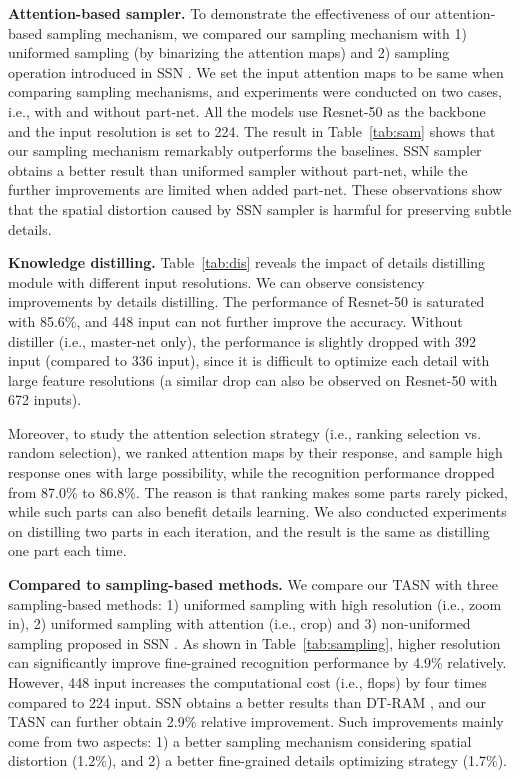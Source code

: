 \documentclass[10pt,twocolumn,letterpaper]{article}
\begin{document}
\textbf{Attention-based sampler.}
To demonstrate the effectiveness of our attention-based sampling mechanism, we compared our sampling mechanism with 1) uniformed sampling (by binarizing the attention maps) and 2) sampling operation introduced in SSN \cite{recasens2018learning}. We set the input attention maps to be same when comparing sampling mechanisms, and experiments were conducted on two cases, i.e., with and without part-net. All the models use Resnet-50 as the backbone and the input resolution is set to 224. The result in Table~\ref{tab:sam} shows that our sampling mechanism remarkably outperforms the baselines. SSN sampler obtains a better result than uniformed sampler without part-net, while the further improvements are limited when added part-net. These observations show that the spatial distortion caused by SSN sampler is harmful for preserving subtle details.

\textbf{Knowledge distilling.}
Table~\ref{tab:dis} reveals the impact of details distilling module with different input resolutions. We can observe consistency improvements by details distilling. The performance of Resnet-50 \cite{ResNet} is saturated with 85.6\%, and 448 input can not further improve the accuracy. Without distiller (i.e., master-net only), the performance is slightly dropped with 392 input (compared to 336 input), since it is difficult to optimize each detail with large feature resolutions (a similar drop can also be observed on Resnet-50 with 672 inputs).

Moreover, to study the attention selection strategy (i.e., ranking selection vs. random selection), we ranked attention maps by their response, and sample high response ones with large possibility, while the recognition performance dropped from 87.0\% to 86.8\%. The reason is that ranking makes some parts rarely picked, while such parts can also benefit details learning. We also conducted experiments on distilling two parts in each iteration, and the result is the same as distilling one part each time.

\textbf{Compared to sampling-based methods.}
We compare our TASN with three sampling-based methods: 1) uniformed sampling with high resolution (i.e., zoom in), 2) uniformed sampling with attention (i.e., crop) and 3) non-uniformed sampling proposed in SSN \cite{recasens2018learning}. As shown in Table~\ref{tab:sampling}, higher resolution can significantly improve fine-grained recognition performance by 4.9\% relatively. However, 448 input increases the computational cost (i.e., flops) by four times compared to 224 input. SSN \cite{recasens2018learning} obtains a better results than DT-RAM \cite{li2017dynamic}, and our TASN can further obtain 2.9\% relative improvement. Such improvements mainly come from two aspects: 1) a better sampling mechanism considering spatial distortion (1.2\%), and 2) a better fine-grained details optimizing strategy (1.7\%).
\end{document}
